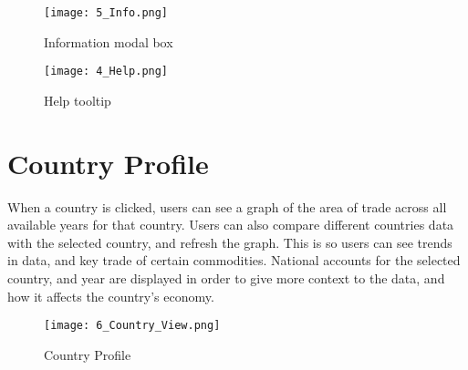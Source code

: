 \begin{figure}[!h]
\centering
\texttt{[image: 5\_Info.png]}
\caption{Information modal box}
\label{fig:x Information modal box}
\end{figure}

\begin{figure}[!h]
\centering
\texttt{[image: 4\_Help.png]}
\caption{Help tooltip}
\label{fig:x Help tooltip}
\end{figure}
\newpage

\section{Country Profile}
When a country is clicked, users can see a graph of the area of trade across all available years for that country. Users can also compare different countries data with the selected country, and refresh the graph. This is so users can see trends in data, and key trade of certain commodities. National accounts for the selected country, and year are displayed in order to give more context to the data, and how it affects the country's economy. 

\begin{figure}[!h]
\centering
\texttt{[image: 6\_Country\_View.png]}
\caption{Country Profile}
\label{fig:x Country Profile}
\end{figure}